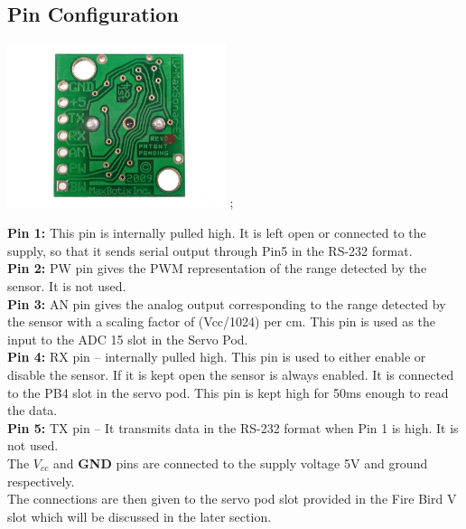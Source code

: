 \documentclass[a4paper,29.6pt]{article}
\begin{document}
\subsection{Pin Configuration}
\begin{small}
  \begin{center}
    \includegraphics[width=0.48\textwidth]{3}
		\cite{app};
  \end{center}
\noindent
\textbf{Pin 1:} This pin is internally pulled high.  It is left open or connected to the supply, so that it sends serial output through Pin5 in the RS-232 format.\\
\textbf{Pin 2:} PW pin gives the PWM representation of the range detected by the sensor. It is not used.\\
\textbf{Pin 3:} AN pin gives the analog output corresponding to the range detected by the sensor with a scaling factor of (Vcc/1024) per cm. This pin is used as the input to the ADC 15 slot in the Servo Pod.\\
\textbf{Pin 4:} RX pin – internally pulled high. This pin is used to either enable or disable the sensor. If it is kept open the sensor is always enabled. It is connected to the PB4 slot in the servo pod. This pin is kept high for 50ms enough to read the data.\\
\textbf{Pin 5:} TX pin – It transmits data in the RS-232 format when Pin  1 is high. It is not used.\\
The \textbf{$V_{cc}$} and \textbf{GND} pins are connected to the supply voltage 5V and ground respectively.\\



The connections are then given to the servo pod slot provided in the Fire Bird V slot which will be discussed in the later section.\\\\
\end{small}
\end{document}
